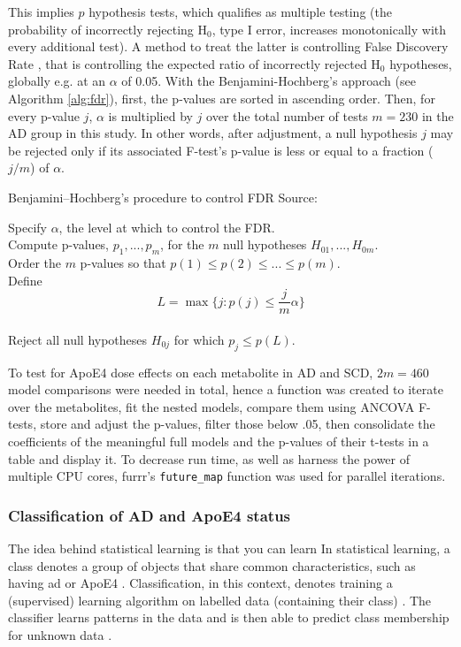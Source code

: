 \documentclass{amsart}
\begin{document}
This implies $p$ hypothesis tests, which qualifies as multiple testing (the probability of incorrectly rejecting H$_0$, type I error, increases monotonically with every additional test). A method to treat the latter is controlling False Discovery Rate \cite{Benjamini1995ControllingTesting}, that is controlling the expected ratio of incorrectly rejected H$_0$ hypotheses, globally e.g. at an $\alpha$ of 0.05. With the Benjamini-Hochberg's approach (see Algorithm \ref{alg:fdr}), first, the p-values are sorted in ascending order. Then, for every p-value $j$, $\alpha$ is multiplied by $j$ over the total number of tests \cite{Benjamini1995ControllingTesting} $m=230$ in the AD group in this study. In other words, after adjustment, a null hypothesis $j$ may be rejected only if its associated F-test's p-value is less or equal to a fraction ($j/m$) of $\alpha$.

\begin{algorithm}
\caption{Benjamini–Hochberg's procedure to control FDR Source: \cite{James2023AnEdition}}\label{alg:fdr}
Specify $\alpha$, the level at which to control the FDR.\\
Compute p-values, $p_1, ... , p_m$, for the $m$ null hypotheses $H_{01},...,H_{0m}$. \\
Order the $m$ p-values so that $p(1) \leq p(2) \leq ... \leq p(m)$.\\
Define
\[L = \max\{j : p(j) \leq \frac{j}{m}\alpha\}\] \\
Reject all null hypotheses $H_{0j}$ for which $p_j \leq p(L)$.
\end{algorithm}

To test for ApoE4 dose effects on each metabolite in AD and SCD, $2m=460$ model comparisons were needed in total, hence a function was created to iterate over the metabolites, fit the nested models, compare them using ANCOVA F-tests, store and adjust the p-values, filter those below .05, then consolidate the coefficients of the meaningful full models and the p-values of their t-tests in a table and display it. To decrease run time, as well as harness the power of multiple CPU cores, \textsf{furrr}'s \texttt{future\_map} function was used for parallel iterations.

\subsubsection{Classification of AD and ApoE4 status}\label{rq2}
The idea behind statistical learning is that you can learn In statistical learning, a class denotes a group of objects that share common characteristics, such as having \acrshort{ad} or ApoE4 \cite*{Drummond2010}. Classification, in this context, denotes training a (supervised) learning algorithm on labelled data (containing their class) \cite*{Drummond2010}. The classifier learns patterns in the data and is then able to predict class membership for unknown data \cite*{Drummond2010}.
\end{document}
